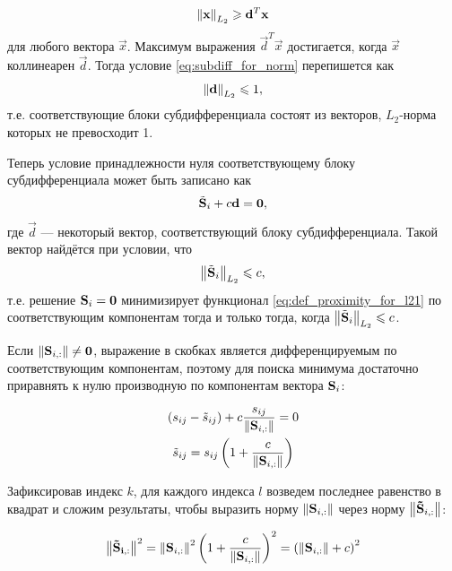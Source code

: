 \begin{equation}
    \left\lVert\mathbf{x}\right\rVert_{L_2} \geqslant \mathbf{d}^T\mathbf{x}
    \label{eq:subdiff_for_norm}
\end{equation}
для любого вектора $\vec{x}$. Максимум выражения $\vec{d}^T\vec{x}$ достигается, когда
$\vec{x}$ коллинеарен $\vec{d}$. Тогда условие \ref{eq:subdiff_for_norm} перепишется
как 
\begin{equation}
    \left\lVert\mathbf{d}\right\rVert_{L_2} \leqslant 1,
\end{equation}
т.е. соответствующие блоки субдифференциала состоят из векторов, $L_2$-норма которых
не превосходит 1.

Теперь условие принадлежности нуля соответствующему блоку субдифференциала может быть записано как
\begin{equation}
    \tilde{\mathbf{S}}_i + c\mathbf{d} = \mathbf{0},
\end{equation}
где $\vec{d}$ --- некоторый вектор, соответствующий блоку субдифференциала.
Такой вектор найдётся при условии, что
\begin{equation}
    \left\lVert\tilde{\mathbf{S}}_i\right\rVert_{L_2} \leqslant c,
\end{equation}
т.е. решение $\mathbf{S}_i = \mathbf{0}$ минимизирует функционал \ref{eq:def_proximity_for_l21} по соответствующим компонентам
тогда и только тогда, когда $\left\lVert\tilde{\mathbf{S}}_i\right\rVert_{L_2} \leqslant c$.

Если $\left\lVert\mathbf{S}_{i,:}\right\rVert \neq \mathbf{0}$, выражение в скобках является дифференцируемым
по соответствующим компонентам, поэтому для поиска минимума достаточно приравнять
к нулю производную по компонентам вектора $\mathbf{S}_i$:

\begin{gather}
    (s_{ij} - \tilde{s}_{ij}) + c \frac{s_{ij}}{\left\lVert\mathbf{S}_{i,:}\right\rVert} = 0\\
    \tilde{s}_{ij} = s_{ij} \left(1 + \frac{c}{\left\lVert\mathbf{S}_{i,:}\right\rVert}\right)
    \label{eq:intermediate_prox_l21}
\end{gather}

Зафиксировав индекс $k$, для каждого индекса $l$ возведем последнее равенство
в квадрат и сложим результаты, чтобы выразить норму $\left\lVert\mathbf{S}_{i,:}\right\rVert$ через норму
$\left\lVert\mathbf{\tilde{S}}_{i,:}\right\rVert$:

\begin{equation}
    \left\lVert\mathbf{\tilde{S}_{i,:}}\right\rVert^2 =
    \left\lVert\mathbf{S}_{i,:}\right\rVert^2 \left( 1 + \frac{c}{\left\lVert\mathbf{S}_{i,:}\right\rVert}\right)^2 =
    \left( \left\lVert\mathbf{S}_{i,:}\right\rVert+ c\right)^2
\end{equation}

